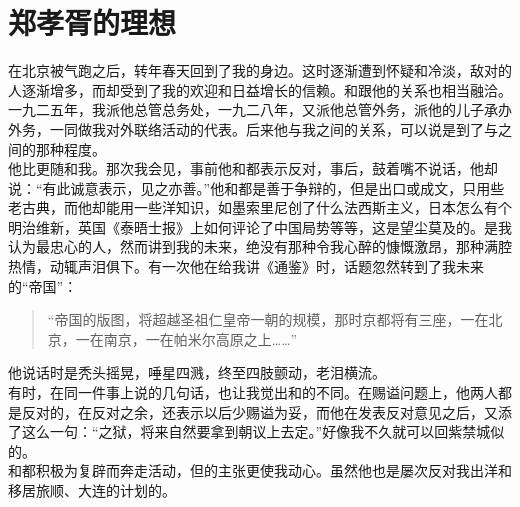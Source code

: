 \fancyhead[RO]{} %
\fancyhead[LE]{} %
\chapter*{郑孝胥的理想}
\thispagestyle{empty}
在北京被气跑之后，转年春天回到了我的身边。这时逐渐遭到怀疑和冷淡，敌对的人逐渐增多，而却受到了我的欢迎和日益增长的信赖。和跟他的关系也相当融洽。一九二五年，我派他总管总务处，一九二八年，又派他总管外务，派他的儿子承办外务，一同做我对外联络活动的代表。后来他与我之间的关系，可以说是到了与之间的那种程度。\\

他比更随和我。那次我会见，事前他和都表示反对，事后，鼓着嘴不说话，他却说：“有此诚意表示，见之亦善。”他和都是善于争辩的，但是出口或成文，只用些老古典，而他却能用一些洋知识，如墨索里尼创了什么法西斯主义，日本怎么有个明治维新，英国《泰晤士报》上如何评论了中国局势等等，这是望尘莫及的。是我认为最忠心的人，然而讲到我的未来，绝没有那种令我心醉的慷慨激昂，那种满腔热情，动辄声泪俱下。有一次他在给我讲《通鉴》时，话题忽然转到了我未来的“帝国”：\\

\begin{quote}
	“帝国的版图，将超越圣祖仁皇帝一朝的规模，那时京都将有三座，一在北京，一在南京，一在帕米尔高原之上……”\\
\end{quote}

他说话时是秃头摇晃，唾星四溅，终至四肢颤动，老泪横流。\\

有时，在同一件事上说的几句话，也让我觉出和的不同。在赐谥问题上，他两人都是反对的，在反对之余，还表示以后少赐谥为妥，而他在发表反对意见之后，又添了这么一句：“之狱，将来自然要拿到朝议上去定。”好像我不久就可以回紫禁城似的。\\

和都积极为复辟而奔走活动，但的主张更使我动心。虽然他也是屡次反对我出洋和移居旅顺、大连的计划的。\\

